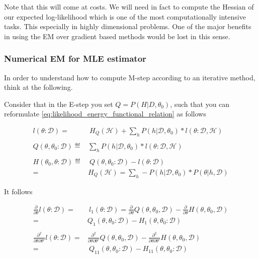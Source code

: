 \documentclass[11pt]{article}
\begin{document}
\begin{article}
Note that this will come at costs. We will need in fact to compute
the Hessian of our expected log-likelihood which is one of the most
computationally intensive tasks. This especially in highly
dimensional problems. One of the major benefits in using the EM over
gradient based methods would be lost in this sense.

\subsubsection{Numerical EM for MLE estimator}
\label{sec:orgd0aa65d}

In order to understand how to compute M-step according to an
iterative method, think at the following.

Consider that in the E-step you set \(Q = P (H| D, \theta_0)\), such
that you can reformulate
\ref{eq:likelihood_energy_functional_relation} as follows

\begin{align} \label{eq:likelihood_energy_iterative}
l (\theta: \mathscr{D}) =& \ H_Q (\mathscr {H}) + \sum_h P(h | \mathscr{D}, \theta_0) * l (\theta: \mathscr{D}, \mathscr{H}) \\
\nonumber\\
Q(\theta, \theta_0 : \mathscr{D}) \eqdef& \sum_h P(h | \mathscr{D}, \theta_0) * l (\theta: \mathscr{D}, \mathscr{H})\\
\nonumber\\  
H(\theta_0, \theta: \mathscr{D}) \eqdef& \ Q(\theta, \theta_0 : \mathscr{D}) - l (\theta: \mathscr{D}) \\
                                 =& H_Q (\mathscr {H}) = \sum_h - P(h | \mathscr{D}, \theta_0) * P(\theta | h, \mathscr{D}) \nonumber
\end{align}

It follows

\begin{align} 
\frac{\partial}{\partial \theta} l (\theta: \mathscr{D}) =& \ l_1 (\theta: \mathscr{D}) = \frac{\partial}{\partial \theta} Q(\theta, \theta_0, \mathscr{D}) - \frac{\partial}{\partial \theta} H(\theta, \theta_0, \mathscr{D}) \nonumber \\
=& Q_1(\theta, \theta_0 : \mathscr{D}) - H_1(\theta, \theta_0 : \mathscr{D})  \label{eq:m-condition-iterative1} \\
\nonumber \\
\frac{\partial^2}{\partial \theta \partial \theta'} l (\theta: \mathscr{D}) =& \frac{\partial^2}{\partial \theta \partial \theta'}  Q(\theta, \theta_0, \mathscr{D}) -  \frac{\partial^2}{\partial \theta \partial \theta'}  H(\theta, \theta_0, \mathscr{D}) \nonumber \\
  =& \ Q_{11}(\theta, \theta_0 : \mathscr{D}) - H_{11}(\theta, \theta_0 : \mathscr{D}) \label{eq:m-condition-iterative2}
\end{align}


\end{article}
\end{document}
